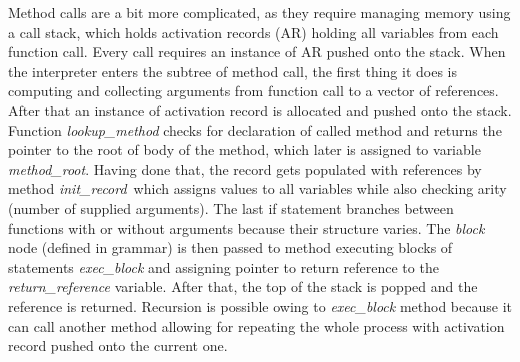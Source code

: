 \documentclass{article}
\begin{document}
    Method calls are a bit more complicated, as they require managing memory
    using a call stack, which holds activation records (AR) holding all variables
    from each function call. Every call requires an instance of AR
    pushed onto the stack. When the interpreter enters the 
    subtree of method call, the first thing it does is computing and 
    collecting arguments from function call to a vector of references. After that 
    an instance of activation record is allocated and pushed onto the stack. Function 
    \emph{lookup\_method} checks for declaration of called method and returns
    the pointer to the root of body of the method, which later is assigned to 
    variable \emph{method\_root}. Having done that, the record gets populated 
    with references by method \emph{init\_record} which assigns values to all 
    variables while also checking arity (number of supplied arguments). The 
    last if statement branches between functions with or without arguments
    because their structure varies. The \emph{block} node 
    (defined in grammar) is then passed to method executing blocks of statements 
    \emph{exec\_block} and assigning pointer to return reference to the 
    \emph{return\_reference} variable. After that, the top of the stack is 
    popped and the reference is returned. Recursion is possible owing to 
    \emph{exec\_block} method because it can call another method
    allowing for repeating the whole process with activation record pushed onto 
    the current one.
\end{document}
